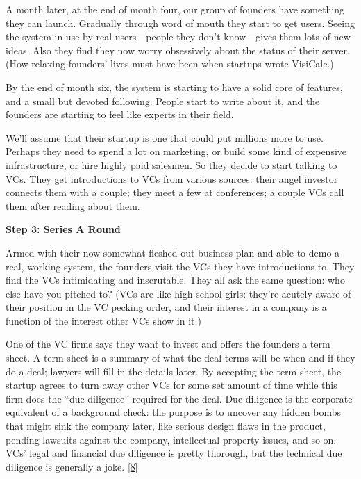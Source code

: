 A month later, at the end of month four, our group of founders have
something they can launch. Gradually through word of mouth they start to
get users. Seeing the system in use by real users---people they don't
know---gives them lots of new ideas. Also they find they now worry
obsessively about the status of their server. (How relaxing founders'
lives must have been when startups wrote VisiCalc.)

By the end of month six, the system is starting to have a solid core of
features, and a small but devoted following. People start to write about
it, and the founders are starting to feel like experts in their field.

We'll assume that their startup is one that could put millions more to
use. Perhaps they need to spend a lot on marketing, or build some kind
of expensive infrastructure, or hire highly paid salesmen. So they
decide to start talking to VCs. They get introductions to VCs from
various sources: their angel investor connects them with a couple; they
meet a few at conferences; a couple VCs call them after reading about
them.

\textbf{Step 3: Series A Round}

Armed with their now somewhat fleshed-out business plan and able to demo
a real, working system, the founders visit the VCs they have
introductions to. They find the VCs intimidating and inscrutable. They
all ask the same question: who else have you pitched to? (VCs are like
high school girls: they're acutely aware of their position in the VC
pecking order, and their interest in a company is a function of the
interest other VCs show in it.)

One of the VC firms says they want to invest and offers the founders a
term sheet. A term sheet is a summary of what the deal terms will be
when and if they do a deal; lawyers will fill in the details later. By
accepting the term sheet, the startup agrees to turn away other VCs for
some set amount of time while this firm does the ``due diligence''
required for the deal. Due diligence is the corporate equivalent of a
background check: the purpose is to uncover any hidden bombs that might
sink the company later, like serious design flaws in the product,
pending lawsuits against the company, intellectual property issues, and
so on. VCs' legal and financial due diligence is pretty thorough, but
the technical due diligence is generally a joke. {[}\hyperref[f8n]{8}{]}

